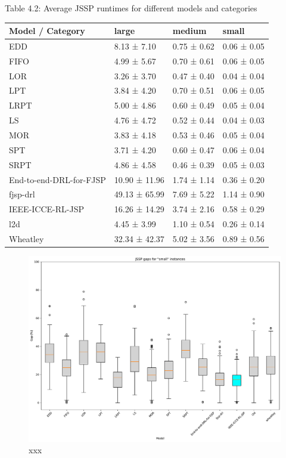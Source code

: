 \begin{table}[H]
    Table 4.2: Average JSSP runtimes for different models and categories\\
    \vspace{1mm}
    \begin{tabular}{llll}
    \toprule
    Model / Category & large & medium & small \\
    \midrule
    EDD & 8.13 ± 7.10 & 0.75 ± 0.62 & 0.06 ± 0.05 \\
    FIFO & 4.99 ± 5.67 & 0.70 ± 0.61 & 0.06 ± 0.05 \\
    LOR & 3.26 ± 3.70 & 0.47 ± 0.40 & 0.04 ± 0.04 \\
    LPT & 3.84 ± 4.20 & 0.70 ± 0.51 & 0.06 ± 0.05 \\
    LRPT & 5.00 ± 4.86 & 0.60 ± 0.49 & 0.05 ± 0.04 \\
    LS & 4.76 ± 4.72 & 0.52 ± 0.44 & 0.04 ± 0.03 \\
    MOR & 3.83 ± 4.18 & 0.53 ± 0.46 & 0.05 ± 0.04 \\
    SPT & 3.71 ± 4.20 & 0.60 ± 0.47 & 0.06 ± 0.04 \\
    SRPT & 4.86 ± 4.58 & 0.46 ± 0.39 & 0.05 ± 0.03 \\
    End-to-end-DRL-for-FJSP & 10.90 ± 11.96 & 1.74 ± 1.14 & 0.36 ± 0.20 \\
    fjsp-drl & 49.13 ± 65.99 & 7.69 ± 5.22 & 1.14 ± 0.90 \\
    IEEE-ICCE-RL-JSP & 16.26 ± 14.29 & 3.74 ± 2.16 & 0.58 ± 0.29 \\
    l2d & 4.45 ± 3.99 & 1.10 ± 0.54 & 0.26 ± 0.14 \\
    Wheatley & 32.34 ± 42.37 & 5.02 ± 3.56 & 0.89 ± 0.56 \\
    \bottomrule
\end{tabular}
\end{table}

\begin{figure}[htbp]
    \centering
    \includegraphics[width=\linewidth]{images/horizontal_boxplot_jssp_small.pdf}
    \caption{xxx}
    \label{fig:boxplot_small}
\end{figure}


